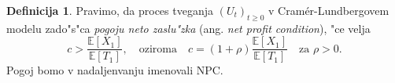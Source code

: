 \documentclass[12pt, a4paper, reqno]{amsart}
\theoremstyle{definition}
\newtheorem{definicija}{Definicija}[section]
\theoremstyle{plain}
\newcommand{\N}{\mathbb{N}}
\newcommand{\E}{\mathbb{E}}
\newcommand{\Prob}{\mathbb{P}}
\newcommand{\1}{\mathds{1}}
\begin{document}
%
%
%

        \begin{definicija}
            Pravimo, da proces tveganja $(U_t)_{t\geq0}$ v Cramér-Lundbergovem modelu
             zado"s"ca \textit{pogoju neto zaslu"zka} (ang. \textit{net profit condition}), "ce velja 
            \begin{equation*}
                c > \frac{\E\left[X_1\right]}{\E\left[T_1\right]}, \quad \text{oziroma} \quad 
                c = (1 + \rho)\frac{\E\left[X_1\right]}{\E\left[T_1\right]} \quad \text{za $\rho > 0$}.
            \end{equation*}
            Pogoj bomo v nadaljenvanju imenovali NPC.
            \label{def:NPC}
        \end{definicija}
\end{document}
